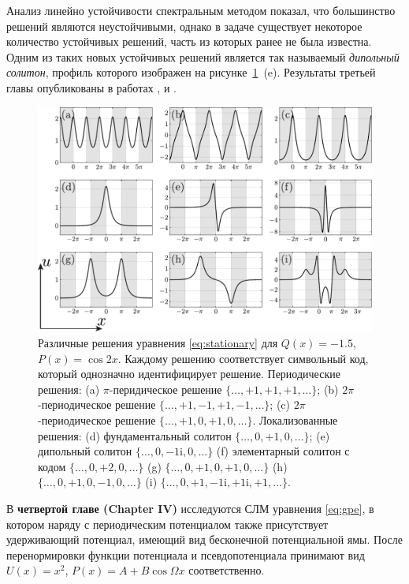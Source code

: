 \documentclass[candidate, href, colorlinks]{disser}
\begin{document}
Анализ линейно устойчивости спектральным методом показал, что большинство решений являются неустойчивыми, однако в задаче существует некоторое количество устойчивых решений, часть из которых ранее не была известна.
Одним из таких новых устойчивых решений является так называемый {\it дипольный солитон}, профиль которого изображен на рисунке~\ref{fig:solutions}~(e).
Результаты третьей главы опубликованы в работах \cite{LebedevAlfimovMalomed}, \cite{NizhniNovgorod2016} и \cite{Tashkent2018}.

\begin{figure}[h!]
\centering
	\includegraphics[scale = 1]{../pic/solutions for cosine equation}
	\caption{
		Различные решения уравнения \eqref{eq:stationary} для $Q(x) = -1.5$, $P(x) = \cos 2x$.
		Каждому решению соответствует символьный код, который однозначно идентифицирует решение.
		Периодические решения: (a) $\pi$-перидическое решение $\{ \dots, +1, +1, +1, \dots \}$; (b) $2 \pi$-периодическое решение $\{ \dots, +1, -1, +1, -1, \dots \}$; (c) $2 \pi$-периодическое решение $\{ \dots, +1, 0, +1, 0, \dots \}$.
		Локализованные решения: (d) фундаментальный солитон $\{ \dots, 0, +1, 0, \dots \}$; (e) дипольный солитон $\{ \dots, 0, -1\mathrm{i}, 0, \dots \}$ (f) элементарный солитон с кодом $\{ \dots, 0, +2, 0, \dots \}$ (g) $\{ \dots, 0, +1, 0, +1, 0, \dots \}$ (h) $\{ \dots, 0, +1, 0, -1, 0, \dots \}$ (i) $\{ \dots, 0, +1, -1\mathrm{i}, +1\mathrm{i}, +1, \dots \}$.
	}
\label{fig:solutions}
\end{figure}

В \textbf{четвертой главе (Chapter IV)} исследуются СЛМ уравнения \eqref{eq:gpe}, в котором наряду с периодическим потенциалом также присутствует удерживающий потенциал, имеющий вид бесконечной потенциальной ямы.
После перенормировки функции потенциала и псевдопотенциала принимают вид $U(x) = x^2$, $P(x) = A + B \cos \Omega x$ соответственно.
\end{document}
